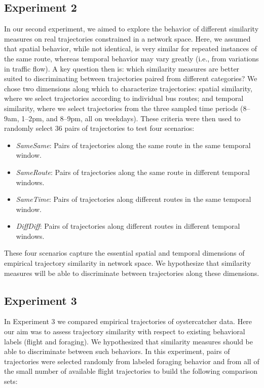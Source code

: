 \documentclass[10pt,letterpaper]{article}
\begin{document}
\subsection{Experiment 2}
\label{par:experiment_2}
In our second experiment, we aimed to explore the behavior of different similarity measures on real trajectories constrained in a network space. Here, we assumed that spatial behavior, while not identical, is very similar for repeated instances of the same route, whereas temporal behavior may vary greatly (i.e., from variations in traffic flow). A key question then is: which similarity measures are better suited to discriminating between trajectories paired from different categories? We chose two dimensions along which to characterize trajectories: spatial similarity, where we select trajectories according to individual bus routes; and temporal similarity, where we select trajectories from the three sampled time periods (8--9am, 1--2pm, and 8--9pm, all on weekdays). These criteria were then used to randomly select 36 pairs of trajectories to test four scenarios:
\begin{itemize}
\itemsep-1ex
\item \emph{SameSame}: Pairs of trajectories along the same route in the same temporal window.
\item \emph{SameRoute}: Pairs of trajectories along the same route in different temporal windows.
\item \emph{SameTime}: Pairs of trajectories along different routes in the same temporal window.
\item \emph{DiffDiff}: Pairs of trajectories along different routes in different temporal windows.
\end{itemize}

These four scenarios capture the essential spatial and temporal dimensions of empirical trajectory similarity in network space. We hypothesize that similarity measures will be able to discriminate between trajectories along these dimensions.  

\subsection{Experiment 3} %
\label{par:experiment_3}
In Experiment 3 we compared empirical trajectories of oystercatcher data. Here our aim was to assess trajectory similarity with respect to existing behavioral labels (flight and foraging). We hypothesized that similarity measures should be able to discriminate between such behaviors. In this experiment, pairs of trajectories were selected randomly from labeled foraging behavior and from all of the small number of available flight trajectories to build the following comparison sets:
\end{document}
